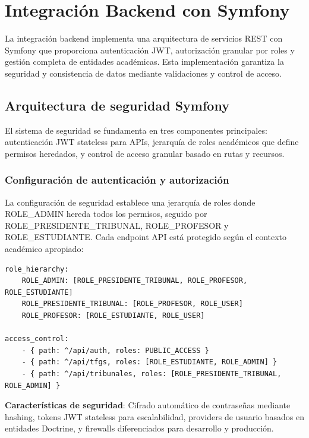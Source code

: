 \documentclass[12pt,a4paper,oneside]{report}
\begin{document}
\section{Integración Backend con Symfony}\label{sistema-de-autenticaciuxf3n-y-roles}

La integración backend implementa una arquitectura de servicios REST con Symfony que proporciona autenticación JWT, autorización granular por roles y gestión completa de entidades académicas. Esta implementación garantiza la seguridad y consistencia de datos mediante validaciones y control de acceso.

\subsection{Arquitectura de seguridad Symfony}\label{implementaciuxf3n-backend-con-symfony-security}

El sistema de seguridad se fundamenta en tres componentes principales: autenticación JWT stateless para APIs, jerarquía de roles académicos que define permisos heredados, y control de acceso granular basado en rutas y recursos.

\subsubsection{Configuración de autenticación y autorización}\label{configuraciuxf3n-de-seguridad}

La configuración de seguridad establece una jerarquía de roles donde ROLE\_ADMIN hereda todos los permisos, seguido por ROLE\_PRESIDENTE\_TRIBUNAL, ROLE\_PROFESOR y ROLE\_ESTUDIANTE. Cada endpoint API está protegido según el contexto académico apropiado:

\begin{lstlisting}
role_hierarchy:
    ROLE_ADMIN: [ROLE_PRESIDENTE_TRIBUNAL, ROLE_PROFESOR, ROLE_ESTUDIANTE]
    ROLE_PRESIDENTE_TRIBUNAL: [ROLE_PROFESOR, ROLE_USER]
    ROLE_PROFESOR: [ROLE_ESTUDIANTE, ROLE_USER]

access_control:
    - { path: ^/api/auth, roles: PUBLIC_ACCESS }
    - { path: ^/api/tfgs, roles: [ROLE_ESTUDIANTE, ROLE_ADMIN] }
    - { path: ^/api/tribunales, roles: [ROLE_PRESIDENTE_TRIBUNAL, ROLE_ADMIN] }
\end{lstlisting}

\textbf{Características de seguridad}: Cifrado automático de contraseñas mediante hashing, tokens JWT stateless para escalabilidad, providers de usuario basados en entidades Doctrine, y firewalls diferenciados para desarrollo y producción.
\end{document}

